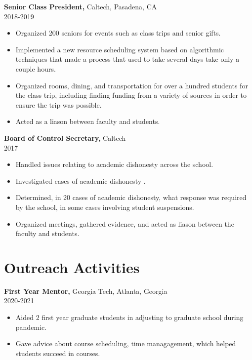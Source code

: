 \documentclass[margin]{res}
\begin{document}
\begin{resume}
       {\bf Senior Class President,} Caltech, Pasadena, CA    \\         2018-2019 
        \begin{itemize} \itemsep -2pt
          \item Organized 200 seniors for events such as class trips and senior gifts.
          \item Implemented a new resource scheduling system based on algorithmic techniques that made a process that used to take several days take only a couple hours.
          \item Organized rooms, dining, and transportation for over a hundred students for the class trip, including finding funding from a variety of sources in order to ensure the trip was possible.
          \item Acted as a liason between faculty and students.
		 \end{itemize}

		{\bf Board of Control Secretary,} Caltech \\   2017
        \begin{itemize} \itemsep -2pt
             \item Handled issues relating to academic dishonesty across the school.
             \item Investigated cases of academic dishonesty .
             \item Determined, in 20 cases of academic dishonesty, what response was required by the school, in some cases involving student suspensions.
             \item Organized meetings, gathered evidence, and acted as liason between the faculty and students.
		 \end{itemize}

\section{Outreach   Activities} 
       {\bf First Year Mentor,} Georgia Tech, Atlanta, Georgia     \\         2020-2021 
        \begin{itemize} \itemsep -2pt
            \item Aided 2 first year graduate students in adjusting to graduate school during pandemic.
          \item Gave advice about course scheduling, time managagement, which helped students succeed in courses.
		 \end{itemize}


\end{resume}
\end{document}
